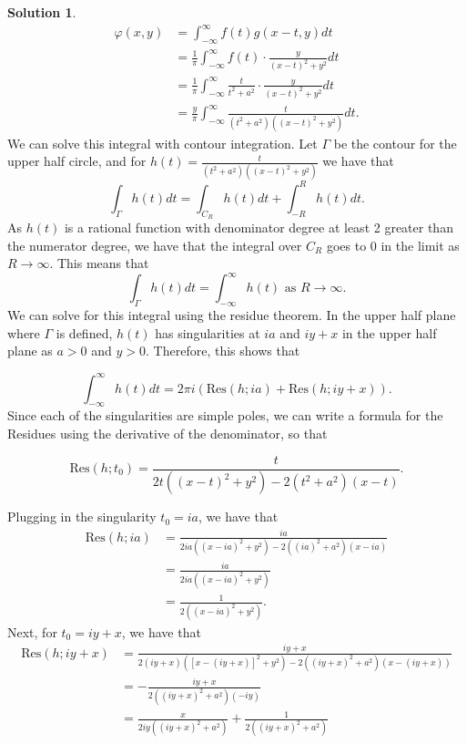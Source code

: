 \documentclass[12pt]{article}
\newcommand{\Res}{\text{Res}}
\renewcommand{\phi}{\varphi}
\theoremstyle{definition}
\newtheorem{sol}{Solution}
\theoremstyle{remark}
\begin{document}
\begin{sol}
 \begin{align*}
     \phi(x,y) &= \int_{-\infty }^{\infty } f(t) g(x-t, y) dt\\
               &= \frac{1}{\pi} \int_{-\infty }^{\infty }  f(t) \cdot \frac{y}{(x-t)^{2}+ y^{2}} dt\\
               &= \frac{1}{\pi} \int_{-\infty }^{\infty }  \frac{t}{t^{2} + a^{2}} \cdot \frac{y}{(x-t)^{2}+ y^{2}} dt\\
               &= \frac{y}{\pi} \int_{-\infty }^{\infty } \frac{t}{(t^{2} + a^{2})((x-t)^{2}+ y^{2})}dt. 
 \end{align*}
 We can solve this integral with contour integration. Let $\Gamma$ be the contour for the upper half circle, and for $h(t) = \frac{t}{(t^{2} + a^{2})((x-t)^{2}+ y^{2})}$ we have that
 \begin{equation*}
     \int_{\Gamma} h(t) dt = \int_{C_{R}} h(t) dt + \int_{-R}^{R} h(t) dt.
 \end{equation*}
 As $h(t)$ is a rational function with denominator degree at least 2 greater than the numerator degree, we have that the integral over $C_{R}$ goes to 0 in the limit as $R\to \infty$. This means that
 \begin{equation*}
     \int_{\Gamma} h(t) dt = \int_{-\infty }^{\infty } h(t) \text{ as  } R\to \infty .
 \end{equation*}
 We can solve for this integral using the residue theorem. In the upper half plane where $\Gamma$ is defined, $h(t)$ has singularities at $ia$ and $iy + x$ in the upper half plane as $a>0$ and $y > 0$. Therefore, this shows that

 \begin{equation*}
     \int_{-\infty }^{\infty } h(t)dt = 2\pi i( \Res(h; ia)  + \Res(h; iy + x)).
 \end{equation*}
 Since each of the singularities are simple poles, we can write a formula for the Residues using the derivative of the denominator, so that

 \begin{equation*}
     \Res(h; t_{0}) = \frac{t}{2t( (x-t)^{2} + y^{2} ) - 2(t^{2} + a^{2})(x-t)}.
 \end{equation*}

 Plugging in the singularity $t_{0} = ia$, we have that
 \begin{align*}
     \Res(h; ia) &= \frac{ia}{2ia((x-ia)^{2} + y^{2}) - 2((ia)^{2} + a^{2})(x-ia)}\\
                    &= \frac{ia}{2ia((x-ia)^{2} + y^{2})}\\ 
                    &= \frac{1}{2((x-ia)^{2} + y^{2})}. 
 \end{align*}
 Next, for $t_{0} = iy + x$, we have that
 \begin{align*}
     \Res(h; iy + x) &= \frac{iy + x}{2(iy + x) ( [x - (iy+x)]^{2} + y^{2} ) - 2((iy + x)^{2} + a^{2})( x - (iy + x) )}\\
                     &=- \frac{iy + x}{2((iy + x)^{2} + a^{2})(-iy)}\\
                     &= \frac{x}{2iy((iy + x)^{2} + a^{2})} + \frac{1}{2 ((iy+x)^{2} + a^{2})}
 \end{align*}


\end{sol}
\end{document}
